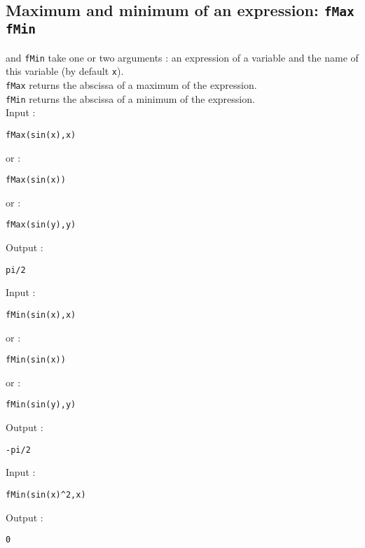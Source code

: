 \documentclass[a4paper,11pt]{book}
\begin{document}
\subsection{Maximum and minimum of an expression: {\tt fMax fMin}} 
 and {\tt fMin} take one or two arguments : an expression 
of a variable and the name of this variable (by default {\tt x}).\\
{\tt fMax} returns the abscissa 
of a maximum of the expression.\\
{\tt fMin} returns the abscissa 
of a minimum of the expression.\\
Input :
\begin{center}{\tt fMax(sin(x),x)}\end{center}
or :
\begin{center}{\tt fMax(sin(x))}\end{center}
or :
\begin{center}{\tt fMax(sin(y),y)}\end{center}
Output :
\begin{center}{\tt pi/2}\end{center} 
Input :
\begin{center}{\tt fMin(sin(x),x)}\end{center}
or :
\begin{center}{\tt fMin(sin(x))}\end{center}
or :
\begin{center}{\tt fMin(sin(y),y)}\end{center}
Output :
\begin{center}{\tt -pi/2}\end{center} 
Input :
\begin{center}{\tt fMin(sin(x)\verb|^|2,x)}\end{center}
Output :
\begin{center}{\tt 0}\end{center}
\end{document}
